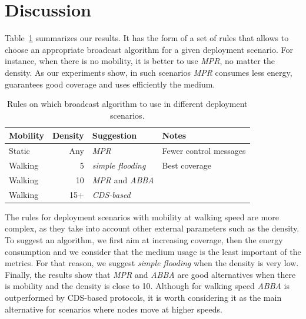 
\section{Discussion}
\label{sec:discussion}

Table~\ref{tbl:rules} summarizes our results.
%
It has the form of a set of rules that allows to choose an appropriate broadcast algorithm for a given deployment scenario.
%
For instance, when there is no mobility, it is better to use \emph{MPR}, no matter the density.
%
As our experiments show, in such scenarios \emph{MPR} consumes less energy, guarantees good coverage and uses efficiently the medium.

\begin{table}[ht]
	\footnotesize
	\centering
	
	\begin{tabular}{lr|p{1.9cm}l}
		\textbf{Mobility} & \textbf{Density} &  \textbf{Suggestion} & \textbf{Notes}\\
		
		\midrule
		Static & Any & \emph{MPR} & Fewer control messages \\
		Walking & 5 & \emph{simple flooding} & Best coverage  \\
		Walking & 10  & \emph{MPR} and \emph{ABBA} &   \\
		Walking & 15+ & \emph{CDS-based} &  \\
		
	\end{tabular}
	
	\caption{Rules on which broadcast algorithm to use in different deployment scenarios.}
	\label{tbl:rules}
	\vspace{-0.2cm}
\end{table}

The rules for deployment scenarios with mobility at walking speed are more complex, as they take into account other external parameters such as the density.
%
To suggest an algorithm, we first aim at increasing coverage, then the energy consumption and we consider that the medium usage is the least important of the metrics.
%
For that reason, we suggest \emph{simple flooding} when the density is very low.
%
Finally, the results show that \emph{MPR} and \emph{ABBA} are good alternatives when there is mobility and the density is close to 10.
%
Although for walking speed \emph{ABBA} is outperformed by CDS-based protocols, it is worth considering it as the main alternative for scenarios where nodes move at higher speeds. 
